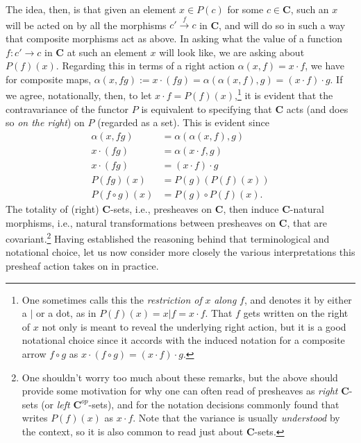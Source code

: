 \documentclass[a4paper]{book}
\theoremstyle{definition}
\theoremstyle{definition}
\theoremstyle{definition}
\theoremstyle{theorem}
\theoremstyle{definition}
\begin{document}
The idea, then, is that given an element $x \in P(c)$ for some $c \in \textbf{C}$, such an $x$ will be acted on by all the morphisms $c' \xrightarrow{f} c$ in \textbf{C}, and will do so in such a way that composite morphisms act as above. In asking what the value of a function $f: c' \rightarrow c$ in \textbf{C} at such an element $x$ will look like, we are asking about $P(f)(x)$. Regarding this in terms of a right action $\alpha(x,f) = x \cdot f$, we have for composite maps, $\alpha(x, fg) := x \cdot (fg) = \alpha(\alpha(x,f), g) = (x \cdot f) \cdot g$. If we agree, notationally, then, to let $x \cdot f = P(f)(x)$,\footnote{One sometimes calls this the \textit{restriction of} $x$ \textit{along} $f$, and denotes it by either a $|$ or a dot, as in $P(f)(x) = x|f = x \cdot f$. That $f$ gets written on the right of $x$ not only is meant to reveal the underlying right action, but it is a good notational choice since it accords with the induced notation for a composite arrow $f \circ g$ as $x \cdot (f \circ g) = (x \cdot f) \cdot g$.} it is evident that the contravariance of the functor $P$ is equivalent to specifying that \textbf{C} acts (and does so \textit{on the right}) on $P$ (regarded as a set). This is evident since 
\begin{equation*}
\begin{split} 
\alpha(x, fg) & = \alpha(\alpha(x,f), g) \\  
x \cdot (fg) & = \alpha (x \cdot f, g)  \\ 
x \cdot (fg) & = (x \cdot f) \cdot g  \\
P(fg)(x) & = P(g)(P(f)(x)) \\ 
P(f \circ g)(x) & = P(g) \circ P(f)(x) .   
\end{split} 
\end{equation*}
The totality of (right) \textbf{C}-sets, i.e., presheaves on \textbf{C}, then induce \textbf{C}-natural morphisms, i.e., natural transformations between presheaves on \textbf{C}, that are covariant.\footnote{One shouldn't worry too much about these remarks, but the above should provide some motivation for why one can often read of presheaves as \textit{right} \textbf{C}-sets (or \textit{left} $\textbf{C}^{op}$-sets), and for the notation decisions commonly found that writes $P(f)(x)$ as $x\cdot f$. Note that the variance is usually \textit{understood} by the context, so it is also common to read just about \textbf{C}-sets.} Having established the reasoning behind that terminological and notational choice, let us now consider more closely the various interpretations this presheaf action takes on in practice.  
\end{document}

